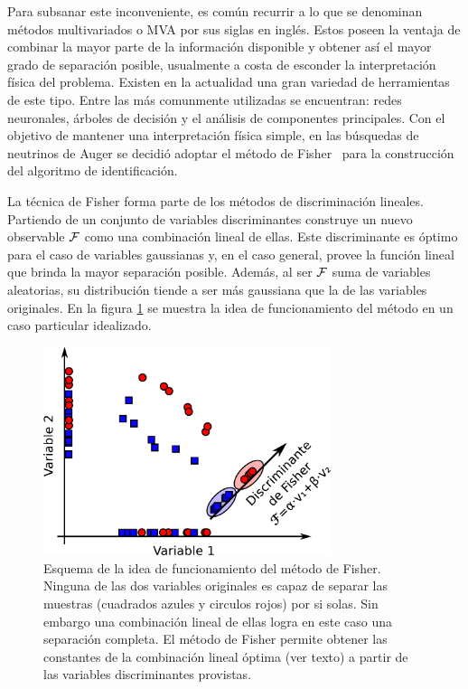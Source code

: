 	Para subsanar este inconveniente, es común recurrir a lo que se denominan métodos multivariados o MVA por sus siglas en inglés.
	Estos poseen la ventaja de combinar la mayor parte de la información disponible y obtener así el mayor grado de separación posible, usualmente a costa de esconder la interpretación física del problema.
	Existen en la actualidad una gran variedad de herramientas de este tipo. Entre las más comunmente utilizadas se encuentran: redes neuronales, árboles de decisión y el análisis de componentes principales. 
	Con el objetivo de mantener una interpretación física simple, en las búsquedas de neutrinos de Auger se decidió adoptar el método de Fisher~\cite{cite:Fisher} para la construcción del algoritmo de identificación.

	La técnica de Fisher forma parte de los métodos de discriminación lineales.
	Partiendo de un conjunto de variables discriminantes construye un nuevo observable ${\cal F}$ como una combinación lineal de ellas.
	Este discriminante es óptimo para el caso de variables gaussianas y, en el caso general, provee la función lineal que brinda la mayor separación posible.
	Además, al ser ${\cal F}$ suma de variables aleatorias, su distribución tiende a ser más gaussiana que la de las variables originales.
	En la figura \ref{fig:ideaFisher} se muestra la idea de funcionamiento del método en un caso particular idealizado.
	\begin{figure}[ht]
	\begin{center}
	\includegraphics[width=0.75\textwidth]{fig/seleccionAuger/ideaFisher}
	\caption{Esquema de la idea de funcionamiento del método de Fisher. Ninguna de las dos variables originales es capaz de separar las muestras (cuadrados azules y circulos rojos) por si solas. Sin embargo una combinación lineal de ellas logra en este caso una separación completa. El método de Fisher permite obtener las constantes de la combinación lineal óptima (ver texto) a partir de las variables discriminantes provistas.}
	\label{fig:ideaFisher}
	\end{center}
	\end{figure}

